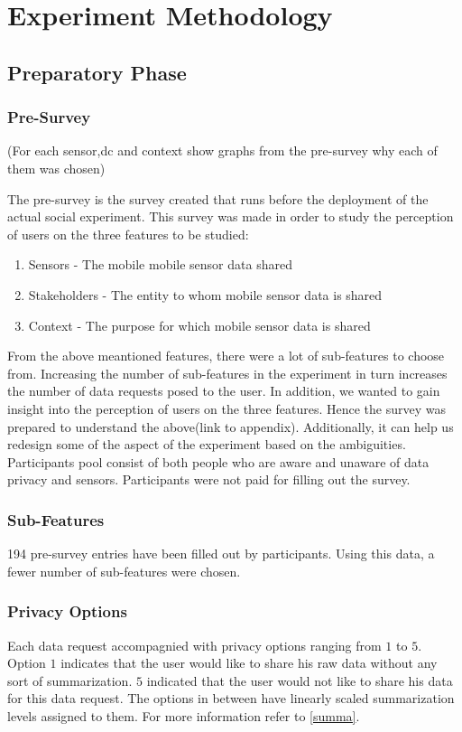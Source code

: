 \chapter{Experiment Methodology} \label{exp}

\section{Preparatory Phase}

\subsection{Pre-Survey}
(For each sensor,dc and context show graphs from the pre-survey why each of them was chosen)

The pre-survey is the survey created that runs before the deployment of the actual social experiment. This
survey was made in order to study the perception of users on the three features to be studied:

\begin{enumerate}
    \item Sensors - The mobile mobile sensor data shared
    \item Stakeholders - The entity to whom mobile sensor data is shared
    \item Context - The purpose for which mobile sensor data is shared
\end{enumerate}

From the above meantioned features, there were a lot of sub-features to choose from.
Increasing the number of sub-features in the experiment in turn increases the number of data requests posed to the user. In addition,
we wanted to gain insight into the perception of users on the three features. Hence the survey
was prepared to understand the above(link to appendix). Additionally, it can help us redesign some of the aspect of the experiment based on the
ambiguities. Participants pool consist of both people who are aware and unaware of data privacy and sensors. Participants were not paid for filling out the survey.

\subsection{Sub-Features}
194 pre-survey entries have been filled out by participants. Using this data, a fewer number of sub-features were chosen.

\subsection{Privacy Options} \label{options}
Each data request accompagnied with privacy options ranging from $1$ to $5$. Option $1$ indicates that the user would like to
share his raw data without any sort of summarization. $5$ indicated that the user would not like to share his data for this data request.
The options in between have linearly scaled summarization levels assigned to them. For more information refer to \ref{summa}.


